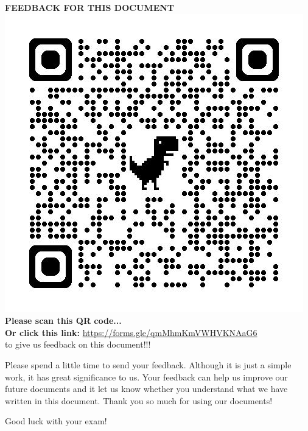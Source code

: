 \documentclass[12pt]{article}
\begin{document}
\begin{center}
    \textbf{FEEDBACK FOR THIS DOCUMENT}\\
    \includegraphics[width=0.5\linewidth]{qr.jpg}\\
    \textbf{Please scan this QR code...}\\
    \textbf{Or click this link:} \url{https://forms.gle/qmMhmKmVWHVKNAaG6} \\
    to give us feedback on this document!!!
\end{center}
Please spend a little time to send your feedback. Although it is just a simple work, it has great significance to us. Your feedback can help us improve our future documents and it let us know whether you understand what we have written in this document. Thank you so much for using our documents!\\
\begin{center}
    Good luck with your exam!
\end{center}
\end{document}
